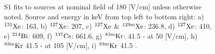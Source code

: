 \begin{figure}[h!]
\bigskip

\hfill
{}
\hfill
{}

\caption{S1 fits to sources at nominal field of 180 [V/cm] unless otherwise noted. Source and energy in keV from top left to bottom right: a) $\rm ^{131}Xe$: 163, b) $\rm ^{127}Xe$:  207, c) $\rm ^{127}Xe$ \&  $\rm ^{129m}Xe$: 236.8, d)  $\rm ^{127}Xe$: 410, e) $\rm ^{214}Bi$: 609, f) $\rm ^{137}Cs$: 661.6, g) $\rm ^{83m}Kr$: 41.5 - at 50 [V/cm], h) $\rm ^{83m}Kr$ 41.5 - at 105 [V/cm], i) $\rm ^{83m}Kr$ 41.5 .}
\label{fig:Doke_Fits_S1}
\end{figure}


